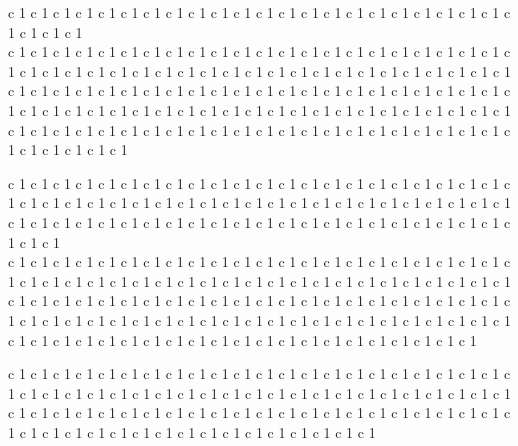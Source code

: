 \documentclass[11pt]{article}
\begin{document}
 c 1  c 1  c 1  c 1  c 1  c 1  c 1  c 1  c 1  c 1  c 1  c 1  c 1  c 1  c 1  c 1  c 1  c 1  c 1  c 1  c 1  c 1  c 1  c 1  c 1  c 1 \\  c 1  c 1  c 1  c 1  c 1  c 1  c 1  c 1  c 1  c 1  c 1  c 1  c 1  c 1  c 1  c 1  c 1  c 1  c 1  c 1  c 1  c 1  c 1  c 1  c 1  c 1  c 1  c 1  c 1  c 1  c 1  c 1  c 1  c 1  c 1  c 1  c 1  c 1  c 1  c 1  c 1
 c 1  c 1  c 1  c 1  c 1  c 1  c 1  c 1  c 1  c 1  c 1  c 1  c 1  c 1  c 1  c 1  c 1  c 1  c 1  c 1  c 1  c 1  c 1  c 1  c 1  c 1  c 1  c 1  c 1  c 1  c 1  c 1  c 1  c 1  c 1  c 1  c 1  c 1  c 1  c 1  c 1  c 1  c 1
 c 1  c 1  c 1  c 1  c 1  c 1  c 1  c 1  c 1  c 1  c 1  c 1  c 1  c 1  c 1  c 1  c 1  c 1  c 1  c 1  c 1  c 1  c 1  c 1  c 1  c 1  c 1  c 1  c 1  c 1  c 1  c 1  c 1  c 1


 c 1  c 1  c 1  c 1  c 1  c 1  c 1  c 1  c 1  c 1  c 1  c 1  c 1  c 1  c 1  c 1  c 1  c 1  c 1  c 1  c 1  c 1  c 1  c 1  c 1  c 1  c 1  c 1  c 1  c 1  c 1  c 1  c 1  c 1  c 1  c 1  c 1  c 1  c 1  c 1  c 1  c 1  c 1
 c 1  c 1  c 1  c 1  c 1  c 1  c 1  c 1  c 1  c 1  c 1  c 1  c 1  c 1  c 1  c 1  c 1  c 1  c 1  c 1  c 1  c 1  c 1  c 1  c 1  c 1  c 1 \\  c 1  c 1  c 1  c 1  c 1  c 1  c 1  c 1  c 1  c 1  c 1  c 1  c 1  c 1  c 1  c 1  c 1  c 1  c 1  c 1  c 1  c 1  c 1  c 1  c 1  c 1  c 1  c 1  c 1  c 1  c 1  c 1  c 1  c 1  c 1  c 1  c 1  c 1  c 1  c 1  c 1  c 1  c 1  c 1  c 1  c 1  c 1  c 1  c 1  c 1  c 1  c 1  c 1  c 1  c 1  c 1  c 1  c 1  c 1  c 1  c 1  c 1  c 1  c 1  c 1  c 1  c 1  c 1  c 1  c 1
 c 1  c 1  c 1  c 1  c 1  c 1  c 1  c 1  c 1  c 1  c 1  c 1  c 1  c 1  c 1  c 1  c 1  c 1  c 1  c 1  c 1  c 1  c 1  c 1  c 1  c 1  c 1  c 1  c 1  c 1  c 1  c 1  c 1  c 1  c 1  c 1  c 1  c 1  c 1  c 1  c 1

 c 1  c 1  c 1  c 1  c 1  c 1  c 1  c 1  c 1  c 1  c 1  c 1  c 1  c 1  c 1  c 1  c 1  c 1  c 1  c 1  c 1  c 1  c 1  c 1  c 1  c 1  c 1  c 1  c 1  c 1  c 1  c 1  c 1  c 1  c 1  c 1
 c 1  c 1  c 1  c 1  c 1  c 1  c 1  c 1  c 1  c 1  c 1  c 1  c 1  c 1  c 1  c 1  c 1  c 1  c 1  c 1  c 1  c 1  c 1  c 1  c 1  c 1  c 1  c 1  c 1  c 1  c 1  c 1
 c 1  c 1  c 1  c 1  c 1  c 1  c 1  c 1  c 1  c 1  c 1  c 1  c 1  c 1  c 1  c 1
\end{document}
